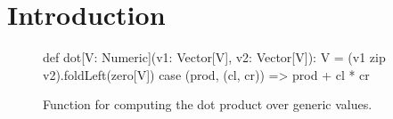 \section{Introduction}

\begin{figure}
\begin{listing}
def dot[V: Numeric](v1: Vector[V], v2: Vector[V]): V =
  (v1 zip v2).foldLeft(zero[V]){ case (prod, (cl, cr)) =>
    prod + cl * cr
  }
\end{listing}
\caption{\label{lst:vector_deep_ir} Function for computing the dot product over generic  values.}
\end{figure}
